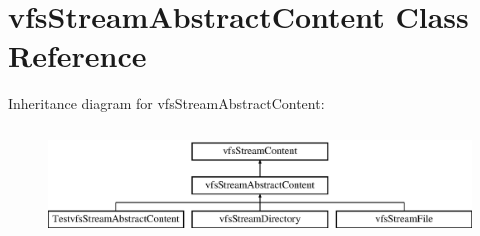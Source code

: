 \hypertarget{classorg_1_1bovigo_1_1vfs_1_1vfs_stream_abstract_content}{}\section{vfs\+Stream\+Abstract\+Content Class Reference}
\label{classorg_1_1bovigo_1_1vfs_1_1vfs_stream_abstract_content}
Inheritance diagram for vfs\+Stream\+Abstract\+Content\+:\begin{figure}[H]
\begin{center}
\leavevmode
\includegraphics[height=2.962963cm]{classorg_1_1bovigo_1_1vfs_1_1vfs_stream_abstract_content}
\end{center}
\end{figure}
